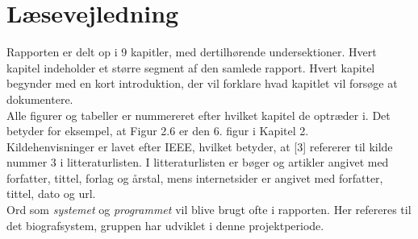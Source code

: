 \newpage
\section*{Læsevejledning}
Rapporten er delt op i 9 kapitler, med dertilhørende undersektioner. Hvert kapitel indeholder et større segment af den samlede rapport.
Hvert kapitel begynder med en kort introduktion, der vil forklare hvad kapitlet vil forsøge at dokumentere.\\ 

Alle figurer og tabeller er nummereret efter hvilket kapitel de optræder i. Det betyder for eksempel, at Figur 2.6 er den 
6. figur i Kapitel 2. \\

Kildehenvisninger er lavet efter IEEE, hvilket betyder, at [3] refererer til kilde nummer 3 i litteraturlisten. 
I litteraturlisten er bøger og artikler angivet med forfatter, tittel, forlag og årstal, mens internetsider er angivet med forfatter, tittel, dato og url. \\ 

Ord som \textit{systemet} og \textit{programmet} vil blive brugt ofte i rapporten. Her refereres til det biografsystem, gruppen har udviklet i denne projektperiode.